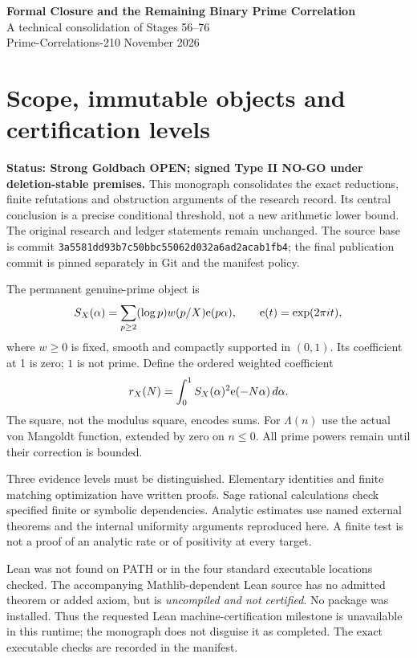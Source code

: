 \documentclass[11pt,a4paper]{article}
\newcommand{\status}[1]{\textbf{Status: #1.}}
\begin{document}
\begin{center}\Large\textbf{Formal Closure and the Remaining Binary Prime Correlation}\\[5pt]
\large A technical consolidation of Stages 56--76\\[4pt]
\normalsize Prime-Correlations-210 November 2026\end{center}
\section{Scope, immutable objects and certification levels}
\status{Strong Goldbach OPEN; signed Type II NO-GO under deletion-stable premises}
This monograph consolidates the exact reductions, finite refutations and obstruction arguments of the research record. Its central conclusion is a precise conditional threshold, not a new arithmetic lower bound. The original research and ledger statements remain unchanged. The source base is commit \texttt{3a5581dd93b7c50bbc55062d032a6ad2acab1fb4}; the final publication commit is pinned separately in Git and the manifest policy.

The permanent genuine-prime object is
\[
 S_X(\alpha)=\sum_{p\ge2}(\log p)w(p/X)\mathrm e(p\alpha),\qquad \mathrm e(t)=\exp(2\pi it),
\]
where $w\ge0$ is fixed, smooth and compactly supported in $(0,1)$. Its coefficient at 1 is zero; $1$ is not prime. Define the ordered weighted coefficient
\[
 r_X(N)=\int_0^1 S_X(\alpha)^2\mathrm e(-N\alpha)\,d\alpha.
\]
The square, not the modulus square, encodes sums. For $\Lambda(n)$ use the actual von Mangoldt function, extended by zero on $n\le0$. All prime powers remain until their correction is bounded.

Three evidence levels must be distinguished. Elementary identities and finite matching optimization have written proofs. Sage rational calculations check specified finite or symbolic dependencies. Analytic estimates use named external theorems and the internal uniformity arguments reproduced here. A finite test is not a proof of an analytic rate or of positivity at every target.

Lean was not found on PATH or in the four standard executable locations checked. The accompanying Mathlib-dependent Lean source has no admitted theorem or added axiom, but is \emph{uncompiled and not certified}. No package was installed. Thus the requested Lean machine-certification milestone is unavailable in this runtime; the monograph does not disguise it as completed. The exact executable checks are recorded in the manifest.
\end{document}
